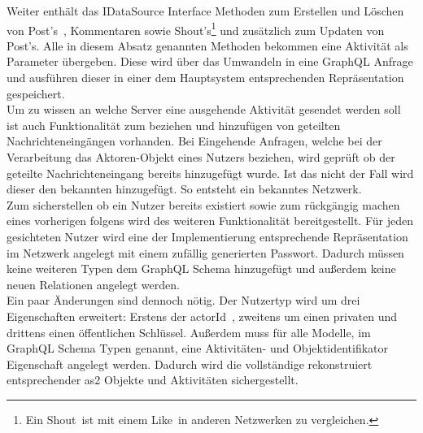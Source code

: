 Weiter enthält das IDataSource Interface Methoden zum Erstellen und Löschen von \glqq Post's\grqq~, Kommentaren sowie \glqq Shout's\grqq\footnote{Ein \glqq Shout\grqq~ist mit einem \glqq Like\grqq~in anderen Netzwerken zu vergleichen.} und zusätzlich zum Updaten von \glqq Post's\grqq. Alle in diesem Absatz genannten Methoden bekommen eine Aktivität als Parameter übergeben. Diese wird über das Umwandeln in eine GraphQL Anfrage und ausführen dieser in einer dem Hauptsystem entsprechenden Repräsentation gespeichert.\\

Um zu wissen an welche Server eine ausgehende Aktivität gesendet werden soll ist auch Funktionalität zum beziehen und hinzufügen von geteilten Nachrichteneingängen vorhanden. Bei Eingehende Anfragen, welche bei der Verarbeitung das Aktoren-Objekt eines Nutzers beziehen, wird geprüft ob der geteilte Nachrichteneingang bereits hinzugefügt wurde. Ist das nicht der Fall wird dieser den bekannten hinzugefügt. So entsteht ein \glqq bekanntes Netzwerk\grqq.\\

Zum sicherstellen ob ein Nutzer bereits existiert sowie zum rückgängig machen eines vorherigen folgens wird des weiteren Funktionalität bereitgestellt. Für jeden gesichteten Nutzer wird eine der Implementierung entsprechende Repräsentation im Netzwerk angelegt mit einem zufällig generierten Passwort. Dadurch müssen keine weiteren Typen dem GraphQL Schema hinzugefügt und außerdem keine neuen Relationen angelegt werden.\\

Ein paar Änderungen sind dennoch nötig. Der Nutzertyp wird um drei Eigenschaften erweitert: Erstens der \glqq actorId\grqq~, zweitens um einen privaten und drittens einen öffentlichen Schlüssel. Außerdem muss für alle Modelle, im GraphQL Schema Typen genannt, eine Aktivitäten- und Objektidentifikator Eigenschaft angelegt werden. Dadurch wird die vollständige rekonstruiert entsprechender \gls{as2} Objekte und Aktivitäten sichergestellt.\\

